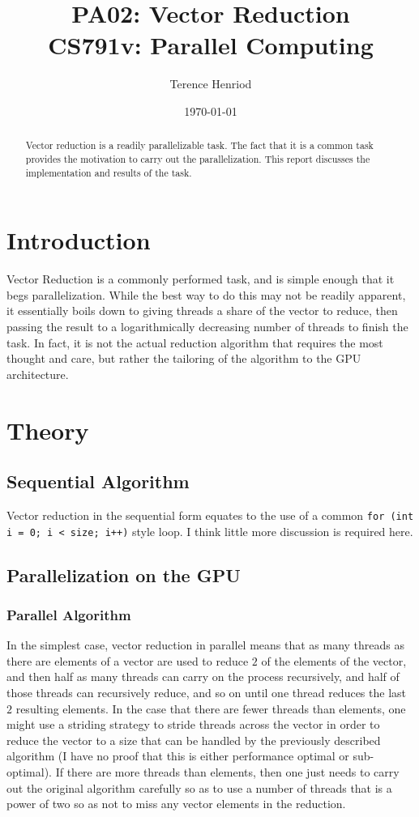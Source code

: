 \documentclass{article}
\title{PA02: Vector Reduction\\CS791v: Parallel Computing}
\author{Terence Henriod}
\date{\today}
\begin{document}
\clearpage
\maketitle
\thispagestyle{empty} %

\begin{abstract}
Vector reduction is a readily parallelizable task. The fact that it is a common task provides the motivation to carry out the parallelization. This report discusses the implementation and results of the task.
\end{abstract}

\newpage
\section{Introduction}
Vector Reduction is a commonly performed task, and is simple enough that it begs parallelization. While the best way to do this may not be readily apparent, it essentially boils down to giving threads a share of the vector to reduce, then passing the result to a logarithmically decreasing number of threads to finish the task. In fact, it is not the actual reduction algorithm that requires the most thought and care, but rather the tailoring of the algorithm to the GPU architecture.

\section{Theory}
\subsection{Sequential Algorithm}
Vector reduction in the sequential form equates to the use of a common \texttt{for (int i = 0; i < size; i++)} style loop. I think little more discussion is required here.

\subsection{Parallelization on the GPU}
\subsubsection{Parallel Algorithm}
In the simplest case, vector reduction in parallel means that as many threads as there are elements of a vector are used to reduce $2$ of the elements of the vector, and then half as many threads can carry on the process recursively, and half of those threads can recursively reduce, and so on until one thread reduces the last $2$ resulting elements. In the case that there are fewer threads than elements, one might use a striding strategy to stride threads across the vector in order to reduce the vector to a size that can be handled by the previously described algorithm (I have no proof that this is either performance optimal or sub-optimal). If there are more threads than elements, then one just needs to carry out the original algorithm carefully so as to use a number of threads that is a power of two so as not to miss any vector elements in the reduction.
\end{document}
